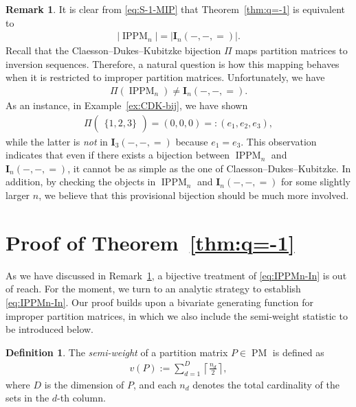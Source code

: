 \documentclass[12pt,reqno]{amsart}
\numberwithin{equation}{section}
\theoremstyle{theorem}
\theoremstyle{definition}
\newtheorem{definition}[theorem]{Definition}
\newtheorem{remark}[theorem]{Remark}
\theoremstyle{named}
\newcommand{\MatP}{\operatorname{PM}}
\newcommand{\sw}{v}
\newcommand{\bI}{\mathbf{I}}
\newcommand{\IPPM}{\operatorname{IPPM}}
\begin{document}
\begin{remark}\label{rmk:no-bij}
	It is clear from \eqref{eq:S-1-MIP} that Theorem~\ref{thm:q=-1} is equivalent to
	\begin{align}\label{eq:IPPMn-In}
		|\IPPM_{n}| = |\bI_n(-,-,=)|.
	\end{align}
	Recall that the Claesson--Dukes--Kubitzke bijection $\Pi$ maps partition matrices to inversion sequences. Therefore, a natural question is how this mapping behaves when it is restricted to improper partition matrices. Unfortunately, we have
	\begin{align*}
		\Pi(\IPPM_{n}) \ne \bI_n(-,-,=).
	\end{align*}
	As an instance, in Example~\ref{ex:CDK-bij}, we have shown
	\begin{align*}
		\Pi\begin{pmatrix}
			\{1,2,3\}
		\end{pmatrix} = (0,0,0) =: (e_1, e_2, e_3),
	\end{align*}
	while the latter is \emph{not} in $\bI_3(-,-,=)$ because $e_1=e_3$. This observation indicates that even if there exists a bijection between $\IPPM_{n}$ and $\bI_n(-,-,=)$, it cannot be as simple as the one of Claesson--Dukes--Kubitzke. In addition, by checking the objects in $\IPPM_{n}$ and $\bI_n(-,-,=)$ for some slightly larger $n$, we believe that this provisional bijection should be much more involved.
\end{remark}

\section{Proof of Theorem~\ref{thm:q=-1}}\label{sec:MIP-GF}

As we have discussed in Remark~\ref{rmk:no-bij}, a bijective treatment of \eqref{eq:IPPMn-In} is out of reach. For the moment, we turn to an analytic strategy to establish \eqref{eq:IPPMn-In}. Our proof builds upon a bivariate generating function for improper partition matrices, in which we also include the semi-weight statistic to be introduced below.

\begin{definition}\label{def:semi-weight}
	The \emph{semi-weight} of a partition matrix $P\in \MatP$ is defined as
	\begin{align*}
		\sw(P) := \sum_{d=1}^D \left\lceil \frac{n_d}{2} \right\rceil,
	\end{align*}
	where $D$ is the dimension of $P$, and each $n_d$ denotes the total cardinality of the sets in the $d$-th column.
\end{definition}
\end{document}
